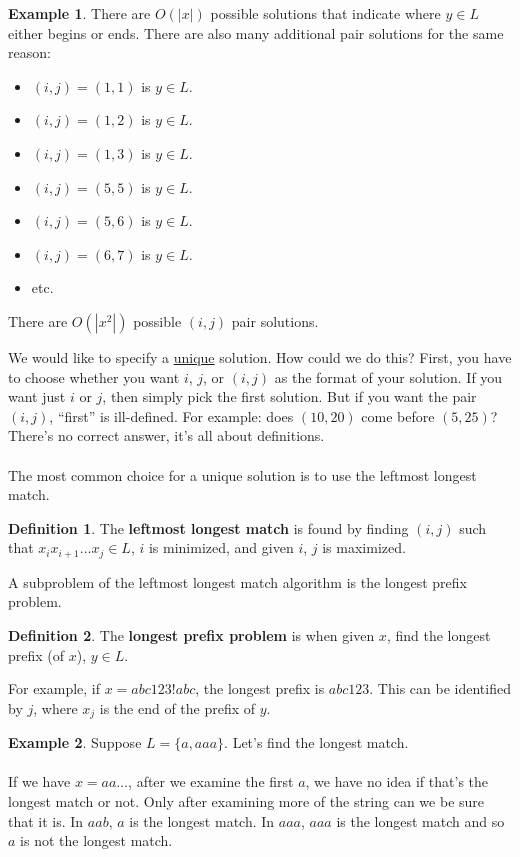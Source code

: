 \documentclass[]{article}
\theoremstyle{definition}
\newtheorem*{defn}{Definition}
\newtheorem{ex}{Example}[section]
\begin{document}
\begin{ex}
					There are $O(|x|)$ possible solutions that indicate where $y \in L$ either begins or ends. There are also many additional pair solutions for the same reason:
					\begin{itemize}
						\item $(i, j) = (1, 1)$ is $y \in L$.
						\item $(i, j) = (1, 2)$ is $y \in L$.
						\item $(i, j) = (1, 3)$ is $y \in L$.
						\item $(i, j) = (5, 5)$ is $y \in L$.
						\item $(i, j) = (5, 6)$ is $y \in L$.
						\item $(i, j) = (6, 7)$ is $y \in L$.
						\item etc.
					\end{itemize}

					There are $O(|x^2|)$ possible $(i, j)$ pair solutions.
				\end{ex}
				We would like to specify a \underline{unique} solution. How could we do this? First, you have to choose whether you want $i$, $j$, or $(i, j)$ as the format of your solution. If you want just $i$ or $j$, then simply pick the first solution. But if you want the pair $(i, j)$, ``first'' is ill-defined. For example: does $(10, 20)$ come before $(5, 25)$? There's no correct answer, it's all about definitions.
				\\ \\
				The most common choice for a unique solution is to use the leftmost longest match.
				\begin{defn}
					The \textbf{leftmost longest match} is found by finding $(i, j)$ such that $x_i x_{i + 1} \ldots x_j \in L$, $i$ is minimized, and given $i$, $j$ is maximized.
				\end{defn}
				A subproblem of the leftmost longest match algorithm is the longest prefix problem.
				\begin{defn}
					The \textbf{longest prefix problem} is when given $x$, find the longest prefix (of $x$), $y \in L$.
				\end{defn}

				For example, if $x = abc123!abc$, the longest prefix is $abc123$. This can be identified by $j$, where $x_j$ is the end of the prefix of $y$.
				\begin{ex}
					Suppose $L = \{a, aaa\}$. Let's find the longest match.
					\\ \\
					If we have $x = aa\ldots$, after we examine the first $a$, we have no idea if that's the longest match or not. Only after examining more of the string can we be sure that it is. In $aab$, $a$ is the longest match. In $aaa$, $aaa$ is the longest match and so $a$ is not the longest match.
				\end{ex}
\end{document}
